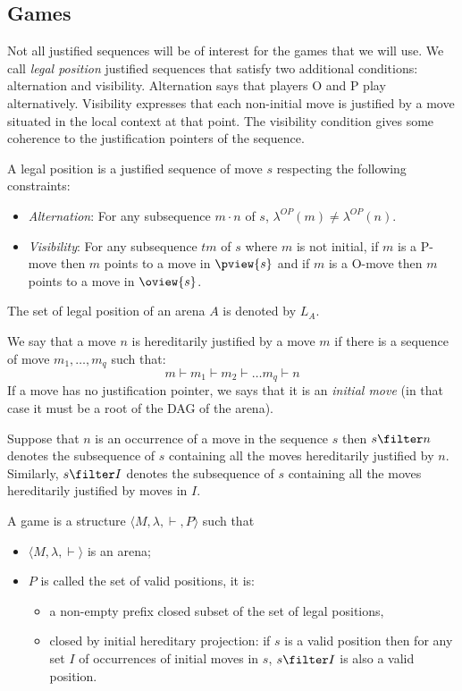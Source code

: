 \subsection{Games}

Not all justified sequences will be of interest for the
games that we will use. We call \emph{legal position} justified
sequences that satisfy two additional conditions: alternation and
visibility. Alternation says that players O and P play
alternatively. Visibility expresses that each non-initial move is
justified by a move situated in the local context at that point.
The visibility condition gives some coherence to the
justification pointers of the sequence.

\begin{definition}
A legal position is a justified sequence of move $s$ respecting the following constraints:
\begin{itemize}
\item \emph{Alternation}: For any subsequence $m \cdot n$ of $s$, $\lambda^{OP}(m) \neq \lambda^{OP}(n)$.
\item \emph{Visibility}: For any subsequence $t m$ of $s$ where $m$ is not initial, if $m$ is a P-move then $m$ points to a move in $\pview{s}$
and if $m$ is a O-move then $m$ points to a move in $\oview{s}$.
\end{itemize}
The set of legal position of an arena $A$ is denoted by $L_A$.
\end{definition}

We say that a move $n$ is hereditarily justified by a move $m$ if there is a sequence of move
$m_1, \ldots, m_q$ such that:
$$ m \vdash m_1 \vdash m_2 \vdash \ldots m_q \vdash n$$
If a move has no justification pointer, we says that it is an
\emph{initial move} (in that case it must be a root of the DAG of the arena).

Suppose that $n$ is an occurrence of a move in the sequence $s$ then
$s \filter n$ denotes the subsequence of $s$ containing all
the moves hereditarily justified by $n$. Similarly, $s
\filter I$ denotes the subsequence of $s$ containing all the
moves hereditarily justified by moves in $I$.

\begin{definition}[Game]
A game is a structure $\langle M, \lambda, \vdash, P \rangle$ such that
\begin{itemize}
\item $ \langle M, \lambda, \vdash \rangle$ is an arena;
\item $P$ is called the set of valid positions, it is:
    \begin{itemize}
    \item a non-empty prefix closed subset of the set of legal
    positions,
    \item closed by initial hereditary projection: if $s$ is a valid position then for any set $I$ of occurrences of initial moves
    in $s$, $s\filter I$ is also a valid position.
    \end{itemize}
\end{itemize}
\end{definition}

